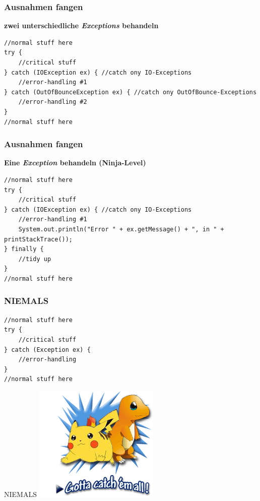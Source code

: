 \documentclass[18pt]{beamer}
\begin{document}
\begin{frame}[containsverbatim]
	\frametitle{Ausnahmen fangen}
	
	\textbf{zwei unterschiedliche \emph{Exceptions} behandeln}
	\begin{lstlisting}
//normal stuff here
try {
	//critical stuff
} catch (IOException ex) { //catch ony IO-Exceptions
	//error-handling #1
} catch (OutOfBounceException ex) { //catch ony OutOfBounce-Exceptions
	//error-handling #2
}
//normal stuff here
	\end{lstlisting}
\end{frame}


\begin{frame}[containsverbatim]
	\frametitle{Ausnahmen fangen}

	\textbf{Eine \emph{Exception} behandeln (Ninja-Level)}
	\begin{lstlisting}
//normal stuff here
try {
	//critical stuff
} catch (IOException ex) { //catch ony IO-Exceptions
	//error-handling #1
	System.out.println("Error " + ex.getMessage() + ", in " + printStackTrace());
} finally {
	//tidy up
}
//normal stuff here
	\end{lstlisting}
\end{frame}


\begin{frame}[containsverbatim]
	\frametitle{NIEMALS}
	
	\begin{lstlisting}
//normal stuff here
try {
	//critical stuff
} catch (Exception ex) {
	//error-handling
}
//normal stuff here
	\end{lstlisting}
\end{frame}

\begin{frame}{NIEMALS}
	\includegraphics[scale=1]{bilder/catch_em_all.png}
\end{frame}
\end{document}
